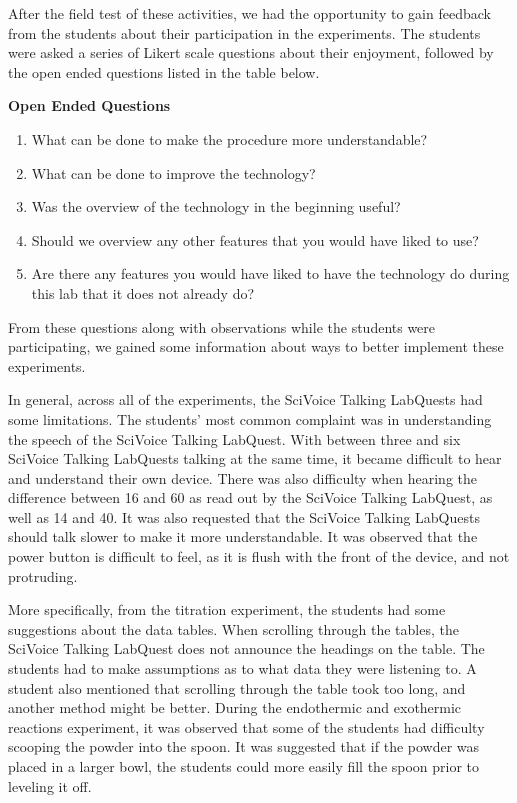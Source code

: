 \documentclass[11.5pt]{sig-alternate} %
\begin{document}
\begin{large}
After the field test of these activities, we had the opportunity to gain feedback from the students about their participation in the experiments. The students were asked a series of Likert scale questions about their enjoyment, followed by the open ended questions listed in the table below.

\textbf{Open Ended Questions}
\begin{enumerate}
    \item 	What can be done to make the procedure more understandable?
    \item 	What can be done to improve the technology?
    \item 	Was the overview of the technology in the beginning useful?
    \item 	Should we overview any other features that you would have liked to use?
    \item 	Are there any features you would have liked to have the technology do during this lab that it does not already do?
\end{enumerate}

From these questions along with observations while the students were participating, we gained some information about ways to better implement these experiments. 

In general, across all of the experiments, the SciVoice Talking LabQuests had some limitations. The students’ most common complaint was in understanding the speech of the SciVoice Talking LabQuest. With between three and six SciVoice Talking LabQuests talking at the same time, it became difficult to hear and understand their own device. There was also difficulty when hearing the difference between 16 and 60 as read out by the SciVoice Talking LabQuest, as well as 14 and 40. It was also requested that the SciVoice Talking LabQuests should talk slower to make it more understandable. It was observed that the power button is difficult to feel, as it is flush with the front of the device, and not protruding. 

More specifically, from the titration experiment, the students had some suggestions about the data tables. When scrolling through the tables, the SciVoice Talking LabQuest does not announce the headings on the table. The students had to make assumptions as to what data they were listening to. A student also mentioned that scrolling through the table took too long, and another method might be better. 
During the endothermic and exothermic reactions experiment, it was observed that some of the students had difficulty scooping the powder into the spoon. It was suggested that if the powder was placed in a larger bowl, the students could more easily fill the spoon prior to leveling it off. 


\end{large}
\end{document}
